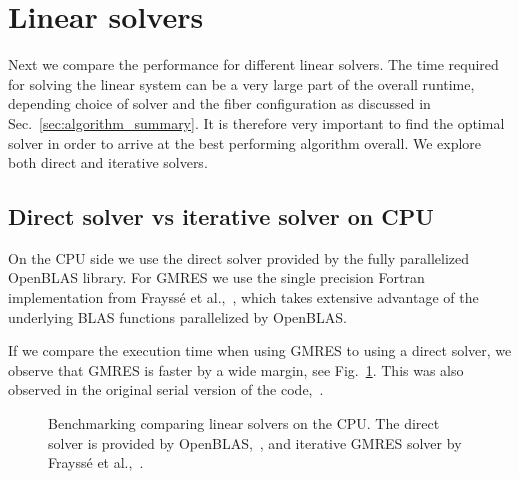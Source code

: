 \section{Linear solvers}
\label{sec:bench_linear_solvers}

Next we compare the performance for different linear solvers. The time required for solving the linear system can be a very large part of the overall runtime, depending choice of solver and the fiber configuration as discussed in Sec.~\ref{sec:algorithm_summary}. It is therefore very important to find the optimal solver in order to arrive at the best performing algorithm overall. We explore both direct and iterative solvers.

\subsection{Direct solver vs iterative solver on CPU}
On the CPU side we use the direct solver provided by the fully parallelized OpenBLAS library. For GMRES we use the single precision Fortran implementation from Frayssé et al.,~\cite{Fraysse2003}, which takes extensive advantage of the underlying BLAS functions parallelized by OpenBLAS. 

If we compare the execution time when using GMRES to using a direct solver, we observe that GMRES is faster by a wide margin, see Fig.~\ref{fig:bench_openmp_solvers}. This was also observed in the original serial version of the code,~\cite{Tornberg2006}.

\begin{figure}[htbp]
  \centering
  \caption[Benchmark linear solvers on CPU.]{Benchmarking comparing linear solvers on the CPU. The direct solver is provided by OpenBLAS,~\cite{OpenBLAS}, and iterative GMRES solver by Frayssé et al.,~\cite{Fraysse2003}.}
  \label{fig:bench_openmp_solvers}
\end{figure}

